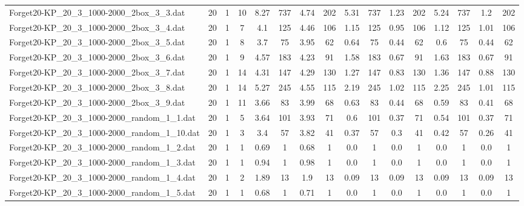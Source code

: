 \begin{sidewaystable}[!ht]
{\begin{tabular}{lccccccccccccccc}
Forget20-KP\_20\_3\_1000-2000\_2box\_3\_3.dat & 20 & 1 & 10 & 8.27 & 737 & 4.74 & 202 & 5.31 & 737 & 1.23 & 202 & 5.24 & 737 &  \textcolor{blue2}{1.2} & 202 \\
Forget20-KP\_20\_3\_1000-2000\_2box\_3\_4.dat & 20 & 1 & 7 & 4.1 & 125 & 4.46 & 106 & 1.15 & 125 &  \textcolor{blue2}{0.95} & 106 & 1.12 & 125 & 1.01 & 106 \\
Forget20-KP\_20\_3\_1000-2000\_2box\_3\_5.dat & 20 & 1 & 8 & 3.7 & 75 & 3.95 & 62 & 0.64 & 75 &  \textcolor{blue2}{0.44} & 62 & 0.6 & 75 &  \textcolor{blue2}{0.44} & 62 \\
Forget20-KP\_20\_3\_1000-2000\_2box\_3\_6.dat & 20 & 1 & 9 & 4.57 & 183 & 4.23 & 91 & 1.58 & 183 &  \textcolor{blue2}{0.67} & 91 & 1.63 & 183 &  \textcolor{blue2}{0.67} & 91 \\
Forget20-KP\_20\_3\_1000-2000\_2box\_3\_7.dat & 20 & 1 & 14 & 4.31 & 147 & 4.29 & 130 & 1.27 & 147 &  \textcolor{blue2}{0.83} & 130 & 1.36 & 147 & 0.88 & 130 \\
Forget20-KP\_20\_3\_1000-2000\_2box\_3\_8.dat & 20 & 1 & 14 & 5.27 & 245 & 4.55 & 115 & 2.19 & 245 & 1.02 & 115 & 2.25 & 245 &  \textcolor{blue2}{1.01} & 115 \\
Forget20-KP\_20\_3\_1000-2000\_2box\_3\_9.dat & 20 & 1 & 11 & 3.66 & 83 & 3.99 & 68 & 0.63 & 83 & 0.44 & 68 & 0.59 & 83 &  \textcolor{blue2}{0.41} & 68 \\
Forget20-KP\_20\_3\_1000-2000\_random\_1\_1.dat & 20 & 1 & 5 & 3.64 & 101 & 3.93 & 71 & 0.6 & 101 &  \textcolor{blue2}{0.37} & 71 & 0.54 & 101 &  \textcolor{blue2}{0.37} & 71 \\
Forget20-KP\_20\_3\_1000-2000\_random\_1\_10.dat & 20 & 1 & 3 & 3.4 & 57 & 3.82 & 41 & 0.37 & 57 & 0.3 & 41 & 0.42 & 57 &  \textcolor{blue2}{0.26} & 41 \\
Forget20-KP\_20\_3\_1000-2000\_random\_1\_2.dat & 20 & 1 & 1 & 0.69 & 1 & 0.68 & 1 &  \textcolor{blue2}{0.0} & 1 &  \textcolor{blue2}{0.0} & 1 &  \textcolor{blue2}{0.0} & 1 &  \textcolor{blue2}{0.0} & 1 \\
Forget20-KP\_20\_3\_1000-2000\_random\_1\_3.dat & 20 & 1 & 1 & 0.94 & 1 & 0.98 & 1 &  \textcolor{blue2}{0.0} & 1 &  \textcolor{blue2}{0.0} & 1 &  \textcolor{blue2}{0.0} & 1 &  \textcolor{blue2}{0.0} & 1 \\
Forget20-KP\_20\_3\_1000-2000\_random\_1\_4.dat & 20 & 1 & 2 & 1.89 & 13 & 1.9 & 13 &  \textcolor{blue2}{0.09} & 13 &  \textcolor{blue2}{0.09} & 13 &  \textcolor{blue2}{0.09} & 13 &  \textcolor{blue2}{0.09} & 13 \\
Forget20-KP\_20\_3\_1000-2000\_random\_1\_5.dat & 20 & 1 & 1 & 0.68 & 1 & 0.71 & 1 &  \textcolor{blue2}{0.0} & 1 &  \textcolor{blue2}{0.0} & 1 &  \textcolor{blue2}{0.0} & 1 &  \textcolor{blue2}{0.0} & 1 \\

\end{tabular}}
\end{sidewaystable}
